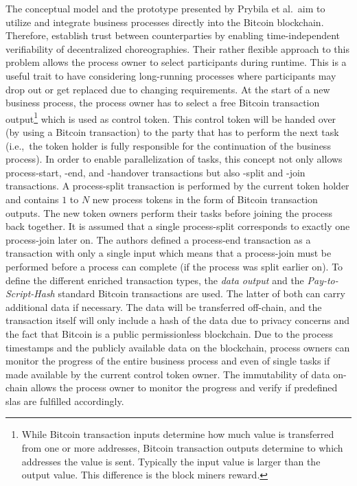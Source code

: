 The conceptual model and the prototype presented by Prybila et al.\ aim to utilize and integrate business processes directly into the Bitcoin blockchain. Therefore, establish trust between counterparties by enabling time-independent verifiability of decentralized choreographies. Their rather flexible approach to this problem allows the process owner to select participants during runtime. This is a useful trait to have considering long-running processes where participants may drop out or get replaced due to changing requirements. At the start of a new business process, the process owner has to select a free Bitcoin transaction output\footnote{While Bitcoin transaction inputs determine how much value is transferred from one or more addresses, Bitcoin transaction outputs determine to which addresses the value is sent. Typically the input value is larger than the output value. This difference is the block miners reward.} which is used as control token. This control token will be handed over (by using a Bitcoin transaction) to the party that has to perform the next task (i.e.,\ the token holder is fully responsible for the continuation of the business process). In order to enable parallelization of tasks, this concept not only allows process-start, -end, and -handover transactions but also -split and -join transactions. A process-split transaction is performed by the current token holder and contains $1$ to $N$ new process tokens in the form of Bitcoin transaction outputs. The new token owners perform their tasks before joining the process back together. It is assumed that a single process-split corresponds to exactly one process-join later on. The authors defined a process-end transaction as a transaction with only a single input which means that a process-join must be performed before a process can complete (if the process was split earlier on). To define the different enriched transaction types, the \textit{data output} and the \textit{Pay-to-Script-Hash} standard Bitcoin transactions are used. The latter of both can carry additional data if necessary. The data will be transferred off-chain, and the transaction itself will only include a hash of the data due to privacy concerns and the fact that Bitcoin is a public permissionless blockchain. Due to the process timestamps and the publicly available data on the blockchain, process owners can monitor the progress of the entire business process and even of single tasks if made available by the current control token owner. The immutability of data on-chain allows the process owner to monitor the progress and verify if predefined \glspl{sla} are fulfilled accordingly.

